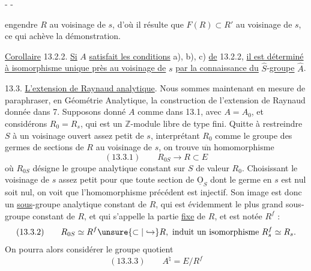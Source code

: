 \begin{center}-  -\end{center}
engendre $R$ au voisinage de $s$, d'où il résulte que $F(R)\subset R'$ au voisinage de $s$, ce qui achève la démonstration.

\uline{Corollaire} 13.2.2. \uline{Si} $A$ \uline{satisfait les conditions} a), b), c) \uline{de} 13.2.2, \uline{il est déterminé à isomorphisme unique près au voisinage de} $s$ \uline{par la connaissance du} $\widehat S$-\uline{groupe} $\widehat A$.

13.3. \uline{L'extension de Raynaud analytique}. Nous sommes maintenant en mesure de paraphraser, en Géométrie Analytique, la construction de l'extension de Raynaud donnée dans 7. Supposons donné $A$ comme dans 13.1, avec $A=A_0$, et considérons $R_0=R_s$, qui est un $\mathbb Z$-module libre de type fini. Quitte à restreindre $S$ à un voisinage ouvert assez petit de $s$, interprétant $R_0$ comme le groupe des germes de sections de $R$ au voisinage de $s$, on trouve $\overline{\text{un}}$ homomorphisme
\[
(13.3.1)\qquad R_{0S}\longrightarrow R\subset E
\]
où $R_{0S}$ désigne le groupe analytique constant sur $S$ de valeur $R_0$. Choisissant le voisinage de $s$ assez petit pour que toute section de $\underline{\mathrm O}_S$ dont le germe en $s$ est nul soit nul, on voit que l'homomorphisme précédent est injectif. Son image est donc un \uline{sous}-groupe analytique constant de $R$, qui est évidemment le plus grand sous-groupe constant de $R$, et qui s'appelle la partie \uline{fixe} de $R$, et est notée $R^f$ :
\[
(13.3.2)\qquad R_{0S}\simeq R^f\unsure{\subset|\hookrightarrow}R,\ \text{induit un isomorphisme }R^f_s\simeq R_s.
\]
On pourra alors considérer le groupe quotient
\[
(13.3.3)\qquad A^{\natural}=E/R^f
\]
